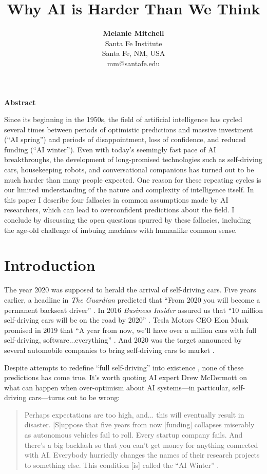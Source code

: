 \documentclass{article}
\title{\textbf{Why AI is Harder Than We Think}}
\author{\textbf{Melanie Mitchell} \\ \normalsize Santa Fe Institute \\ Santa Fe, NM, USA \\ mm@santafe.edu \\
}
\date{}
\begin{document}
\maketitle

\begin{center} \textbf{Abstract} \end{center}
Since its beginning in the 1950s, the field of artificial intelligence has cycled several times between periods of optimistic predictions and massive investment (``AI spring'') and periods of disappointment, loss of confidence, and reduced funding (``AI winter''). Even with today’s seemingly fast pace of AI breakthroughs, the development of long-promised technologies such as self-driving cars, housekeeping robots, and conversational companions has turned out to be much harder than many people expected. One reason for these repeating cycles is our limited understanding of the nature and complexity of intelligence itself. In this paper I describe four fallacies in common assumptions made by AI researchers, which can lead to overconfident predictions about the field. I conclude by discussing the open questions spurred by these fallacies, including the age-old challenge of imbuing machines with humanlike common sense.

\section*{Introduction}
The year 2020 was supposed to herald the arrival of self-driving cars.  Five years earlier, a headline in \textit{The Guardian} predicted that ``From 2020 you will become a permanent backseat driver'' \cite{Guardian2015}. In 2016 \textit{Business Insider} assured us that ``10 million self-driving cars will be on the road by 2020'' \cite{BusinessInsider2016}.  Tesla Motors CEO Elon Musk promised in 2019 that ``A year from now, we'll have over a million cars with full self-driving, software...everything'' \cite{Verge2019}. And 2020 was the target announced by several automobile companies to bring self-driving cars to market \cite{Verge2017,PhysOrg2015,Toyota2020}.

Despite attempts to redefine ``full self-driving'' into existence \cite{CarAndDriver2021}, none of these predictions has come true.  It's worth quoting AI expert Drew McDermott on what can happen when over-optimism about AI systems---in particular, self-driving cars---turns out to be wrong:
\begin{quote}
   Perhaps expectations are too high, and... this will eventually result in disaster. [S]uppose that five years from now [funding] collapses miserably as autonomous vehicles fail to roll.  Every startup company fails. And there's a big backlash so that you can't get money for anything connected with AI. Everybody hurriedly changes the names of their research projects to something else. This condition [is] called the ``AI Winter'' \cite{McDermott1985}.
\end{quote}
\end{document}
